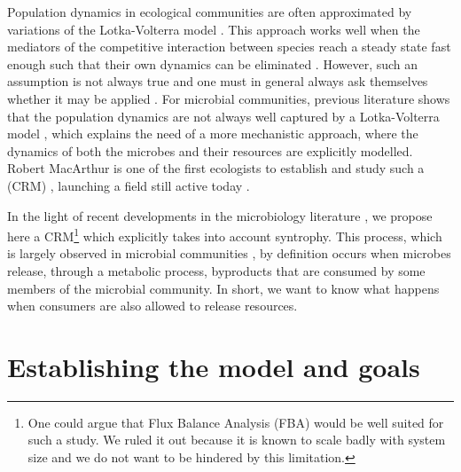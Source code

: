 \documentclass[12pt, titlepage]{report}
\begin{document}
Population dynamics in ecological communities are often approximated by variations of the Lotka-Volterra model \cite{lotka_analytical_1920}. This approach works well when the mediators of the competitive interaction between species reach a steady state fast enough such that their own dynamics can be eliminated \cite{momeni_lotka-volterra_2017}. However, such an assumption is not always true and one must in general always ask themselves whether it may be applied \cite{odwyer_whence_2018}. For microbial communities, previous literature shows that the population dynamics are not always well captured by a Lotka-Volterra model \cite{momeni_lotka-volterra_2017}, which explains the need of a more mechanistic approach, where the dynamics of both the microbes and their resources are explicitly modelled. Robert MacArthur is one of the first ecologists to establish and study such a  (CRM) \cite{macarthur_species_1970}, launching a field still active today \cite{brunner_metabolite_2019}.

In the light of recent developments in the microbiology literature \cite{morris_microbial_2013}, we propose here a CRM\footnote{One could argue that Flux Balance Analysis (FBA) \cite{orth_what_2010} would be well suited for such a study. We ruled it out because it is known to scale badly \cite{thiele_multiscale_2012} with system size and we do not want to be hindered by this limitation.} which explicitly takes into account syntrophy. This process, which is largely observed in microbial communities \cite{morris_microbial_2013}, by definition occurs when microbes release, through a metabolic process, byproducts that are consumed by some members of the microbial community. In short, we want to know what happens when consumers are also allowed to release resources.

\section{Establishing the model and goals}
\end{document}
